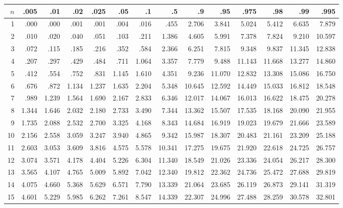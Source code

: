 \hspace{-2cm}
{\tiny
\begin{tabular} {r|rrrr|rrrrr|rrrr}
$n$ & .005 & .01 & .02 & .025 & .05 & .1 & .5 & .9 & .95 & .975
& .98 & .99 & .995 \\
\hline
  1 & .000 & .000 & .001 & .001 & .004 & .016 & .455 & 
      2.706 & 3.841 & 5.024 & 5.412 & 6.635 & 7.879 \\
  2 & .010 & .020 & .040 & .051 & .103 & .211 & 1.386 & 4.605 &
      5.991 & 7.378 & 7.824 & 9.210 & 10.597 \\
  3 & .072 & .115 & .185 & .216 & .352 & .584 & 2.366 & 
      6.251 & 7.815 & 9.348 & 9.837 & 11.345 & 12.838 \\
  4 & .207 & .297 & .429 & .484 & .711 & 1.064 & 3.357 &
      7.779 & 9.488 & 11.143 & 11.668 & 13.277 & 14.860 \\
  5 & .412 & .554 & .752 & .831 & 1.145 & 1.610 & 4.351 &
      9.236 & 11.070 & 12.832 & 13.308 & 15.086 & 16.750 \\
\hline
  6 & .676 & .872 & 1.134 & 1.237 & 1.635 & 2.204 & 5.348 &
      10.645 & 12.592 & 14.449 & 15.033 & 16.812 & 18.548 \\
  7 & .989 & 1.239 & 1.564 & 1.690 & 2.167 & 2.833 & 6.346 &
      12.017 & 14.067 & 16.013 & 16.622 & 18.475 & 20.278 \\
  8 & 1.344 & 1.646 & 2.032 & 2.180 & 2.733 & 3.490 & 7.344 &
      13.362 & 15.507 & 17.535 & 18.168 & 20.090 & 21.955 \\
  9 & 1.735 & 2.088 & 2.532 & 2.700 & 3.325 & 4.168 & 8.343 &
      14.684 & 16.919 & 19.023 & 19.679 & 21.666 & 23.589 \\
 10 & 2.156 & 2.558 & 3.059 & 3.247 & 3.940 & 4.865 & 9.342 &
      15.987 & 18.307 & 20.483 & 21.161 & 23.209 & 25.188 \\
\hline
 11 & 2.603 & 3.053 & 3.609 & 3.816 & 4.575 & 5.578 & 10.341 &
      17.275 & 19.675 & 21.920 & 22.618 & 24.725 & 26.757 \\
 12 & 3.074 & 3.571 & 4.178 & 4.404 & 5.226 & 6.304 & 11.340 & 
      18.549 & 21.026 & 23.336 & 24.054 & 26.217 & 28.300 \\
 13 & 3.565 & 4.107 & 4.765 & 5.009 & 5.892 & 7.042 & 12.340 &
      19.812 & 22.362 & 24.736 & 25.472 & 27.688 & 29.819 \\
 14 & 4.075 & 4.660 & 5.368 & 5.629 & 6.571 & 7.790 & 13.339 & 
      21.064 & 23.685 & 26.119 & 26.873 & 29.141 & 31.319 \\
 15 & 4.601 & 5.229 & 5.985 & 6.262 & 7.261 & 8.547 & 14.339 & 
      22.307 & 24.996 & 27.488 & 28.259 & 30.578 & 32.801 \\

\end{tabular}}
